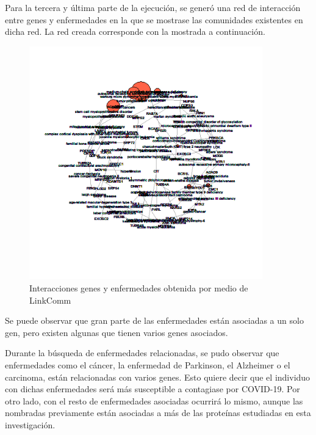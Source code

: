 \newline

Para la tercera y última parte de la ejecución, se generó una red de interacción entre genes y enfermedades en la que se mostrase las comunidades existentes en dicha red. La red creada corresponde con la mostrada a continuación.

\newline

\begin{figure}[h!]
	\includegraphics[width=0.9\textwidth]{figures/figuraLinkcomm.png}
	\caption{Interacciones genes y enfermedades obtenida por medio de LinkComm}
	\label{fig:red_linkcomm}
\end{figure}

\newline

Se puede observar que gran parte de las enfermedades están asociadas a un solo gen, pero existen algunas que tienen varios genes asociados. 

\newline

Durante la búsqueda de enfermedades relacionadas, se pudo observar que enfermedades como el cáncer, la enfermedad de Parkinson, el Alzheimer o el carcinoma, están relacionadas con varios genes. Esto quiere decir que el individuo con dichas enfermedades será más susceptible a contagiase por COVID-19. Por otro lado, con el resto de enfermedades asociadas ocurrirá lo mismo, aunque las nombradas previamente están asociadas a más de las proteínas estudiadas en esta investigación.

